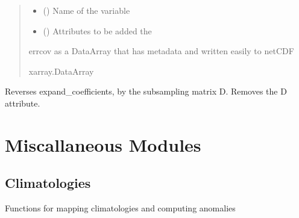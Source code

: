 \documentclass[letterpaper,10pt,english]{sphinxmanual}
\begin{document}
\begin{fulllineitems}
\begin{fulllineitems}
\begin{quote}
\begin{description}
\begin{itemize}
\item {}
\sphinxAtStartPar
{} () \textendash{} Name of the variable

\item {}
\sphinxAtStartPar
{} () \textendash{} Attributes to be added the 

\end{itemize}

\sphinxAtStartPar
{} \textendash{} errcov as a DataArray that has metadata and written easily to netCDF

\sphinxAtStartPar
xarray.DataArray

\end{description}\end{quote}

\end{fulllineitems}


\begin{fulllineitems}
\label{\detokenize{kalman:glomar_gridding.autocorrelation.LassoEstimate_AR1.unexpand_coefficients}}
\pysigstartsignatures
\pysiglinewithargsret
{}
{}
{}
\pysigstopsignatures
\sphinxAtStartPar
Reverses expand\_coefficients, by the
subsampling matrix D. Removes the D attribute.

\end{fulllineitems}


\end{fulllineitems}


\sphinxstepscope


\chapter{Miscallaneous Modules}
\label{\detokenize{misc:miscallaneous-modules}}\label{\detokenize{misc::doc}}

\section{Climatologies}
\label{\detokenize{misc:module-glomar_gridding.climatology}}\label{\detokenize{misc:climatologies}}
\sphinxAtStartPar
Functions for mapping climatologies and computing anomalies
\end{document}

